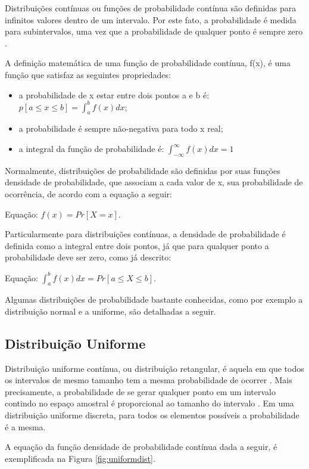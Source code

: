 Distribuições contínuas ou funções de probabilidade contínua são definidas para infinitos valores dentro de um intervalo. Por este fato, a probabilidade é medida para subintervalos, uma vez que a probabilidade de qualquer ponto é sempre zero \cite{distteoria}.

A definição matemática de uma função de probabilidade contínua, f(x), é uma função que satisfaz as seguintes propriedades:

\begin{itemize}
	\item a probabilidade de x estar entre dois pontos a e b é: \(p[a \leqslant x \leqslant b] = \int_{a}^{b}f(x)dx\);
	\item a probabilidade é sempre não-negativa para todo x real;
	\item a integral da função de probabilidade é: \(\int_{-\infty}^{\infty}f(x)dx = 1\)
\end{itemize}

Normalmente, distribuições de probabilidade são definidas por suas funções densidade de probabilidade, que associam a cada valor de x, sua probabilidade de ocorrência, de acordo com a equação a seguir: 

Equação: \(f(x) = Pr[X = x]\).

Particularmente para distribuições contínuas, a densidade de probabilidade é definida como a integral entre dois pontos, já que para qualquer ponto a probabilidade deve ser zero, como já descrito:

Equação: \(\int_{a}^{b}f(x)dx = Pr[a \leqslant X \leqslant b]\).

Algumas distribuições de probabilidade bastante conhecidas, como por exemplo a distribuição normal e a uniforme, são detalhadas a seguir.

\subsection{Distribuição Uniforme}

Distribuição uniforme contínua, ou distribuição retangular, é aquela em que todos os intervalos de mesmo tamanho tem a mesma probabilidade de ocorrer \cite{wikidistuniform1}. Mais precisamente, a probabilidade de se gerar qualquer ponto em um intervalo contindo no espaço amostral é proporcional ao tamanho do intervalo \cite{wikidistuniform2}. Em uma distribuição uniforme discreta, para todos os elementos possíveis a probabilidade é a mesma.

A equação da função densidade de probabilidade contínua dada a seguir, é exemplificada na Figura \ref{fig:uniformdist}.

